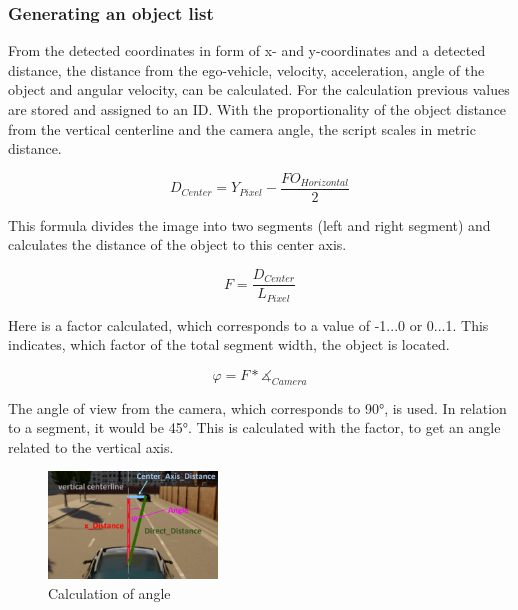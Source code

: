 \subsubsection{Generating an object list}
From the detected coordinates in form of x- and y-coordinates and a detected distance, the distance from the ego-vehicle, velocity, acceleration, angle of the object and angular velocity, can be calculated. For the calculation previous values are stored and assigned to an ID. With the proportionality of the object distance from the vertical centerline and the camera angle, the script scales in metric distance.

\begin{equation}
D_{Center} = Y_{Pixel} - \frac{FO_{Horizontal}}{2}
\label{test}
\end{equation}

This formula divides the image into two segments (left and right segment) and calculates the distance of the object to this center axis.

\begin{equation}
F  = \frac{D_{Center}}{L_{Pixel}}
\end{equation}

Here is a factor calculated, which corresponds to a value of -1...0 or 0...1. This indicates, which factor of the total segment width, the object is located.

\begin{equation}
\varphi = F * \measuredangle_{Camera}
\end{equation}

The angle of view from the camera, which corresponds to \ang{90}, is used. In relation to a segment, it would be \ang{45}. This is calculated with the factor, to get an angle related to the vertical axis.

\begin{figure}[h]
	\centering
	\includegraphics[width=0.4\textwidth]{images/calc_angle.png}
	\caption{Calculation of angle}
	\label{fig:anglecalculation}
\end{figure}

